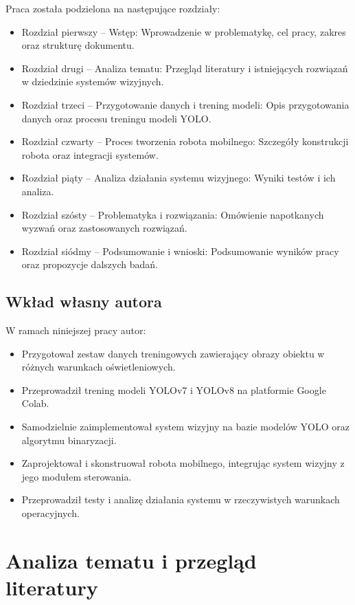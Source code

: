 \documentclass[a4paper,twoside,12pt]{book}
\begin{document}
Praca została podzielona na następujące rozdziały:
\begin{itemize}
    \item Rozdział pierwszy – Wstęp: Wprowadzenie w problematykę, cel pracy, zakres oraz strukturę dokumentu.
    \item Rozdział drugi – Analiza tematu: Przegląd literatury i istniejących rozwiązań w dziedzinie systemów wizyjnych.
    \item Rozdział trzeci – Przygotowanie danych i trening modeli: Opis przygotowania danych oraz procesu treningu modeli YOLO.
    \item Rozdział czwarty – Proces tworzenia robota mobilnego: Szczegóły konstrukcji robota oraz integracji systemów.
    \item Rozdział piąty – Analiza działania systemu wizyjnego: Wyniki testów i ich analiza.
    \item Rozdział szósty – Problematyka i rozwiązania: Omówienie napotkanych wyzwań oraz zastosowanych rozwiązań.
    \item Rozdział siódmy – Podsumowanie i wnioski: Podsumowanie wyników pracy oraz propozycje dalszych badań.
\end{itemize}

\newpage

\section{Wkład własny autora}
W ramach niniejszej pracy autor:
\begin{itemize}
    \item Przygotował zestaw danych treningowych zawierający obrazy obiektu w różnych warunkach oświetleniowych.
    \item Przeprowadził trening modeli YOLOv7 i YOLOv8 na platformie Google Colab.
    \item Samodzielnie zaimplementował system wizyjny na bazie modelów YOLO oraz algorytmu binaryzacji.
    \item Zaprojektował i skonstruował robota mobilnego, integrując system wizyjny z jego modułem sterowania.
    \item Przeprowadził testy i analizę działania systemu w rzeczywistych warunkach operacyjnych.
\end{itemize}


\chapter{Analiza tematu i przegląd literatury}
\end{document}
